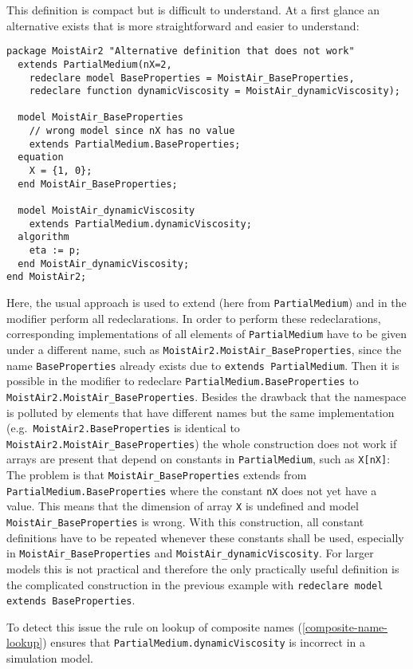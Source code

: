 \begin{nonnormative}
This definition is compact but is difficult to understand. At a
first glance an alternative exists that is more straightforward and
easier to understand:
\begin{lstlisting}[language=modelica]
package MoistAir2 "Alternative definition that does not work"
  extends PartialMedium(nX=2,
    redeclare model BaseProperties = MoistAir_BaseProperties,
    redeclare function dynamicViscosity = MoistAir_dynamicViscosity);

  model MoistAir_BaseProperties
    // wrong model since nX has no value
    extends PartialMedium.BaseProperties;
  equation
    X = {1, 0};
  end MoistAir_BaseProperties;

  model MoistAir_dynamicViscosity
    extends PartialMedium.dynamicViscosity;
  algorithm
    eta := p;
  end MoistAir_dynamicViscosity;
end MoistAir2;
\end{lstlisting}

Here, the usual approach is used to extend (here from \lstinline!PartialMedium!) and in the modifier perform all redeclarations.  In order to perform these redeclarations, corresponding implementations of all elements of \lstinline!PartialMedium! have to be given under a different name, such as \lstinline!MoistAir2.MoistAir_BaseProperties!, since the name \lstinline!BaseProperties! already exists due to \lstinline!extends PartialMedium!.  Then it is possible in the modifier to redeclare \lstinline!PartialMedium.BaseProperties! to \lstinline!MoistAir2.MoistAir_BaseProperties!. Besides the drawback that the namespace is polluted by elements that have different names but the same implementation (e.g.\ \lstinline!MoistAir2.BaseProperties! is identical to \lstinline!MoistAir2.MoistAir_BaseProperties!) the whole construction does not work if arrays are present that depend on constants in \lstinline!PartialMedium!, such as \lstinline!X[nX]!: The problem is that \lstinline!MoistAir_BaseProperties! extends from \lstinline!PartialMedium.BaseProperties! where the constant \lstinline!nX! does not yet have a value.  This means that the dimension of array \lstinline!X! is undefined and model \lstinline!MoistAir_BaseProperties! is wrong.  With this construction, all constant definitions have to be repeated whenever these constants shall be used, especially in \lstinline!MoistAir_BaseProperties! and \lstinline!MoistAir_dynamicViscosity!.  For larger models this is not practical and therefore the only practically useful definition is the complicated construction in the previous example with \lstinline!redeclare model extends BaseProperties!.

To detect this issue the rule on lookup of composite names (\cref{composite-name-lookup}) ensures that \lstinline!PartialMedium.dynamicViscosity! is incorrect in a simulation model.
\end{nonnormative}

